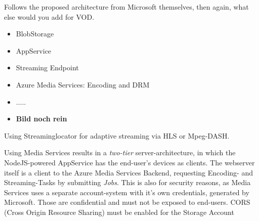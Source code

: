 Follows the proposed architecture from Microsoft themselves\cite{azVODArchitecture}, then again, what else would you add for VOD.
\begin{itemize}
    \item BlobStorage
    \item AppService
    \item Streaming Endpoint
    \item Azure Media Services: Encoding and DRM
    \item  .....
    \item   \textbf{Bild noch rein}
\end{itemize}
Using Streaminglocator for adaptive streaming via HLS or Mpeg-DASH. 

Using Media Services results in a \textit{two-tier} server-architecture, in which the NodeJS-powered AppService has the end-user's devices
as clients. The webserver itself is a client to the Azure Media Services Backend, requesting Encoding- and Streaming-Tasks by
submitting \textit{Jobs}. This is also for security reasons, as Media Services uses a separate account-system with it's own credentials, 
generated by Microsoft.
Those are confidential and must not be exposed to end-users.
CORS (Cross Origin Resource Sharing) must be enabled for the Storage Account
